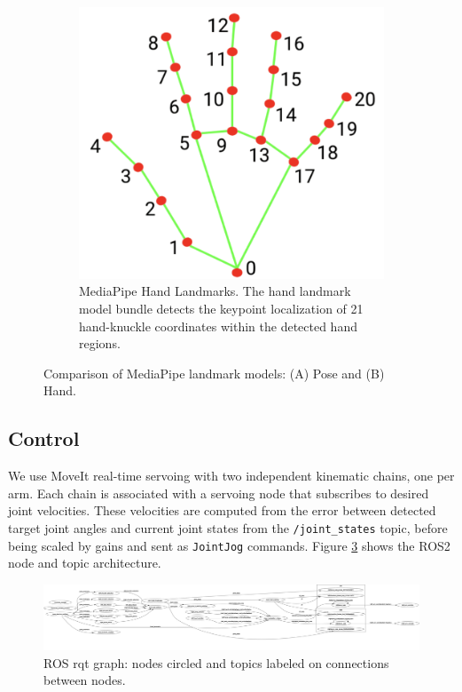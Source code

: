 \documentclass[acmsmall, screen]{acmart}
\begin{document}
\begin{figure}[htbp]
  \hfill
  \begin{subfigure}[b]{0.45\linewidth}
    \centering
    \includegraphics[width=\linewidth]{assets/hand-landmarks.png}
    \caption{MediaPipe Hand Landmarks. The hand landmark model bundle detects the keypoint localization of 21 hand-knuckle coordinates within the detected hand regions.}
    \label{fig:hand-landmarks}
  \end{subfigure}
  \caption{Comparison of MediaPipe landmark models: (A) Pose and (B) Hand.}
  \label{fig:landmarks-comparison}
\end{figure}

\subsection{Control}
We use MoveIt real-time servoing with two independent kinematic chains, one per arm. Each chain is associated with a servoing node that subscribes to desired joint velocities. These velocities are computed from the error between detected target joint angles and current joint states from the \texttt{/joint\_states} topic, before being scaled by gains and sent as \texttt{JointJog} commands. Figure \ref{fig:rosgraph} shows the ROS2 node and topic architecture.

\begin{figure}[htbp]
  \centering
  \includegraphics[width=\linewidth]{assets/rosgraph}
  \caption{ROS rqt graph: nodes circled and topics labeled on connections between nodes.}
  \label{fig:rosgraph}
\end{figure}
\end{document}
